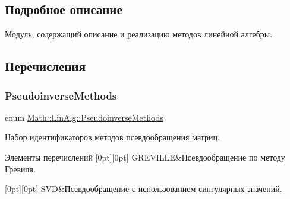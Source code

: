 \subsection{Подробное описание}
Модуль, содержащий описание и реализацию методов линейной алгебры. 

\subsection{Перечисления}
\hypertarget{namespace_math_1_1_lin_alg_a34ee452c5d64eeb10e1bb63cf887af17}{}\label{namespace_math_1_1_lin_alg_a34ee452c5d64eeb10e1bb63cf887af17} 
\subsubsection{\texorpdfstring{Pseudoinverse\+Methods}{PseudoinverseMethods}}
{\footnotesize\ttfamily enum \hyperlink{namespace_math_1_1_lin_alg_a34ee452c5d64eeb10e1bb63cf887af17}{Math\+::\+Lin\+Alg\+::\+Pseudoinverse\+Methods}\hspace{0.3cm}{\ttfamily [strong]}}



Набор идентификаторов методов псевдообращения матриц. 

\begin{DoxyEnumFields}{Элементы перечислений}
[0pt][0pt]{}\hypertarget{namespace_math_1_1_lin_alg_a34ee452c5d64eeb10e1bb63cf887af17a9febc190323c06d33ae8d8716f98bfe9}{}\label{namespace_math_1_1_lin_alg_a34ee452c5d64eeb10e1bb63cf887af17a9febc190323c06d33ae8d8716f98bfe9} 
G\+R\+E\+V\+I\+L\+LE&Псевдообращение по методу Гревиля. \\
\hline

[0pt][0pt]{}\hypertarget{namespace_math_1_1_lin_alg_a34ee452c5d64eeb10e1bb63cf887af17a595e2d2f1a68ede96e96f849a85370bc}{}\label{namespace_math_1_1_lin_alg_a34ee452c5d64eeb10e1bb63cf887af17a595e2d2f1a68ede96e96f849a85370bc} 
S\+VD&Псевдообращение с использованием сингулярных значений. \\
\hline

\end{DoxyEnumFields}


